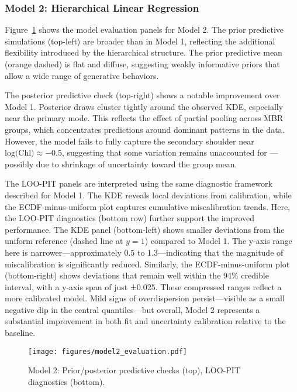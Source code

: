 \documentclass[preprint,authoryear]{elsarticle}
\begin{document}
\subsubsection{Model 2: Hierarchical Linear Regression}

Figure~\ref{fig:model2-eval} shows the model evaluation panels for Model 2. The prior predictive simulations (top-left) are broader than in Model 1, reflecting the additional flexibility introduced by the hierarchical structure. The prior predictive mean (orange dashed) is flat and diffuse, suggesting weakly informative priors that allow a wide range of generative behaviors.

The posterior predictive check (top-right) shows a notable improvement over Model 1. Posterior draws cluster tightly around the observed KDE, especially near the primary mode. This reflects the effect of partial pooling across MBR groups, which concentrates predictions around dominant patterns in the data. However, the model fails to fully capture the secondary shoulder near $\text{log(Chl)} \approx -0.5$, suggesting that some variation remains unaccounted for — possibly due to shrinkage of uncertainty toward the group mean.

The LOO-PIT panels are interpreted using the same diagnostic framework described for Model 1. The KDE reveals local deviations from calibration, while the ECDF-minus-uniform plot captures cumulative miscalibration trends. Here, the LOO-PIT diagnostics (bottom row) further support the improved performance. The KDE panel (bottom-left) shows smaller deviations from the uniform reference (dashed line at $y = 1$) compared to Model 1. The y-axis range here is narrower—approximately 0.5 to 1.3—indicating that the magnitude of miscalibration is significantly reduced. Similarly, the ECDF-minus-uniform plot (bottom-right) shows deviations that remain well within the 94\% credible interval, with a y-axis span of just ±0.025. These compressed ranges reflect a more calibrated model. Mild signs of overdispersion persist—visible as a small negative dip in the central quantiles—but overall, Model 2 represents a substantial improvement in both fit and uncertainty calibration relative to the baseline.



\begin{figure}[H]
\centering
\texttt{[image: figures/model2\_evaluation.pdf]}
\caption{Model 2: Prior/posterior predictive checks (top), LOO-PIT diagnostics (bottom).}
\label{fig:model2-eval}
\end{figure}
\end{document}
